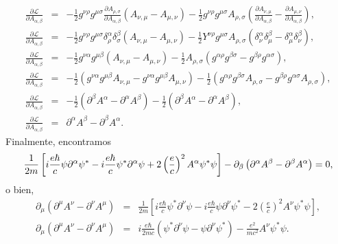 \begin{eqnarray*}
\frac{\partial \mathcal{L}}{\partial A_{\alpha ,\beta }} &=&-\frac{1}{2}%
g^{\nu \rho }g^{\mu \sigma }\frac{\partial A_{\rho ,\sigma }}{\partial
A_{\alpha ,\beta }}\left( A_{\nu ,\mu }-A_{\mu ,\nu }\right) -\frac{1}{2}%
g^{\nu \rho }g^{\mu \sigma }A_{\rho ,\sigma }\left( \frac{\partial A_{\nu
,\mu }}{\partial A_{\alpha ,\beta }}-\frac{\partial A_{\mu ,\nu }}{\partial
A_{\alpha ,\beta }}\right) , \\
\frac{\partial \mathcal{L}}{\partial A_{\alpha ,\beta }} &=&-\frac{1}{2}%
g^{\nu \rho }g^{\mu \sigma }\delta _{\rho }^{\alpha }\delta _{\sigma
}^{\beta }\left( A_{\nu ,\mu }-A_{\mu ,\nu }\right) -\frac{1}{2}Y^{\nu \rho
}g^{\mu \sigma }A_{\rho ,\sigma }\left( \delta _{\nu }^{\alpha }\delta _{\mu
}^{\beta }-\delta _{\mu }^{\alpha }\delta _{\nu }^{\beta }\right) , \\
\frac{\partial \mathcal{L}}{\partial A_{\alpha ,\beta }} &=&-\frac{1}{2}%
g^{\nu \alpha }g^{\mu \beta }\left( A_{\nu ,\mu }-A_{\mu ,\nu }\right) -%
\frac{1}{2}A_{\rho ,\sigma }\left( g^{\alpha \rho }g^{\beta \sigma
}-g^{\beta \rho }g^{\alpha \sigma }\right) , \\
\frac{\partial \mathcal{L}}{\partial A_{\alpha ,\beta }} &=&-\frac{1}{2}%
\left( g^{\nu \alpha }g^{\mu \beta }A_{\nu ,\mu }-g^{\nu \alpha }g^{\mu
\beta }A_{\mu ,\nu }\right) -\frac{1}{2}\left( g^{\alpha \rho }g^{\beta
\sigma }A_{\rho ,\sigma }-g^{\beta \rho }g^{\alpha \sigma }A_{\rho ,\sigma
}\right) , \\
\frac{\partial \mathcal{L}}{\partial A_{\alpha ,\beta }} &=&-\frac{1}{2}%
\left( \partial ^{\beta }A^{\alpha }-\partial ^{\alpha }A^{\beta }\right) -%
\frac{1}{2}\left( \partial ^{\beta }A^{\alpha }-\partial ^{\alpha }A^{\beta
}\right) , \\
\frac{\partial \mathcal{L}}{\partial A_{\alpha ,\beta }} &=&\partial
^{\alpha }A^{\beta }-\partial ^{\beta }A^{\alpha }.
\end{eqnarray*}
Finalmente, encontramos 
\begin{equation}
\frac{1}{2m}\left[ i\frac{e\hbar }{c}\psi \partial ^{\alpha }\psi ^{\ast
}-i\frac{e\hbar }{c}\psi ^{\ast }\partial ^{\alpha }\psi +2\left( \frac{e}{%
c}\right) ^{2}A^{\alpha }\psi ^{\ast }\psi \right] -\partial _{\beta }\left(
\partial ^{\alpha }A^{\beta }-\partial ^{\beta }A^{\alpha }\right) =0,
\end{equation}
o bien, 
\begin{eqnarray*}
\partial _{\mu }\left( \partial ^{\mu }A^{\nu }-\partial ^{\nu }A^{\mu
}\right) &=&\frac{1}{2m}\left[ i\frac{e\hbar }{c}\psi ^{\ast }\partial
^{\nu }\psi -i\frac{e\hbar }{c}\psi \partial ^{\nu }\psi ^{\ast }-2\left( 
\frac{e}{c}\right) ^{2}A^{\nu }\psi ^{\ast }\psi \right] , \\
\partial _{\mu }\left( \partial ^{\mu }A^{\nu }-\partial ^{\nu }A^{\mu
}\right) &=&i\frac{e\hbar }{2mc}\left( \psi ^{\ast }\partial ^{\nu }\psi
-\psi \partial ^{\nu }\psi ^{\ast }\right) -\frac{e^{2}}{mc^{2}}A^{\nu }\psi
^{\ast }\psi .
\end{eqnarray*}
